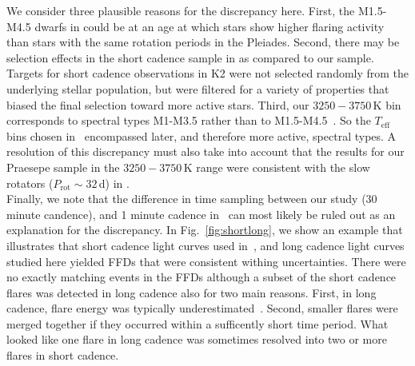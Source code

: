\documentclass{aa}
\begin{document}
We consider three plausible reasons for the discrepancy here. First, the M1.5-M4.5 dwarfs in \citet{raetz2020} could be at an age at which stars show higher flaring activity than stars with the same rotation periods in the Pleiades. Second, there may be selection effects in the short cadence sample in \citet{raetz2020} as compared to our sample. Targets for short cadence observations in K2 were not selected randomly from the underlying stellar population, but were filtered for a variety of properties that biased the final selection toward more active stars. Third, our $3250-3750\,$K bin corresponds to spectral types M1-M3.5 rather than to M1.5-M4.5~\citep{pecaut_intrinsic_2013}. So the $T_\mathrm{eff}$ bins chosen in~\citet{raetz2020} encompassed later, and therefore more active, spectral types. A resolution of this discrepancy must also take into account that the results for our Praesepe sample in the  $3250-3750\,$K range were consistent with the slow rotators ($P_\mathrm{rot}\sim32\,$d) in \citet{raetz2020}.
\\
Finally, we note that the difference in time sampling between our study (30 minute candence), and 1 minute cadence in~\citet{raetz2020} can most likely be ruled out as an explanation for the discrepancy. In Fig.~\ref{fig:shortlong}, we show an example that illustrates that short cadence light curves used in~\citet{raetz2020}, and long cadence light curves studied here yielded FFDs that were consistent withing uncertainties. There were no exactly matching events in the FFDs although a subset of the short cadence flares was detected in long cadence also for two main reasons. First, in long cadence, flare energy was typically underestimated~\citep{yang_flaresampling_2018}. Second, smaller flares were merged together if they occurred within a sufficently short time period. What looked like one flare in long cadence was sometimes resolved into two or more flares in short cadence.
\end{document}
